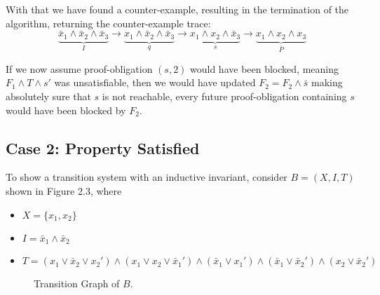 \documentclass[11pt, a4paper, BCOR=10mm, ngerman]{scrbook}
\begin{document}
With that we have found a counter-example, resulting in the termination of the algorithm, returning the counter-example trace: 
\begin{equation*}
\underbrace{\bar x_1 \land \bar x_2 \land \bar x_3}_{I} \rightarrow \underbrace{x_1 \land \bar x_2 \land \bar x_3}_{q} \rightarrow \underbrace{x_1 \land x_2 \land \bar x_3}_{s} \rightarrow \underbrace{x_1 \land x_2 \land x_3}_{\bar P}   
\end{equation*}

If we now assume proof-obligation $(s, 2)$ would have been blocked, meaning $F_1 \land T \land s'$ was unsatisfiable, then we would have updated $F_2 = F_2 \land \bar s$ making absolutely sure that $s$ is not reachable, every future proof-obligation containing $s$ would have been blocked by $F_2$.

\pagebreak

\subsection{Case 2: Property Satisfied}
To show a transition system with an inductive invariant, consider $B = (X, I, T)$ shown in Figure 2.3, where
\begin{itemize}
\item $X = \{x_1, x_2\}$
\item $I = \bar x_1 \land \bar x_2 $
\item  $T = ( x_1 \lor \bar x_2 \lor x_2') \land (x_1 \lor x_2 \lor \bar x_1') \land (\bar x_1 \lor x_1') \land (\bar x_1 \lor \bar x_2') \land (x_2 \lor \bar x_2')$
\end{itemize}
\par

\begin{figure}[H]
\centering
{}
  \caption{Transition Graph of $B$.}
 \end{figure}
 \label{ex1}  
\end{document}
